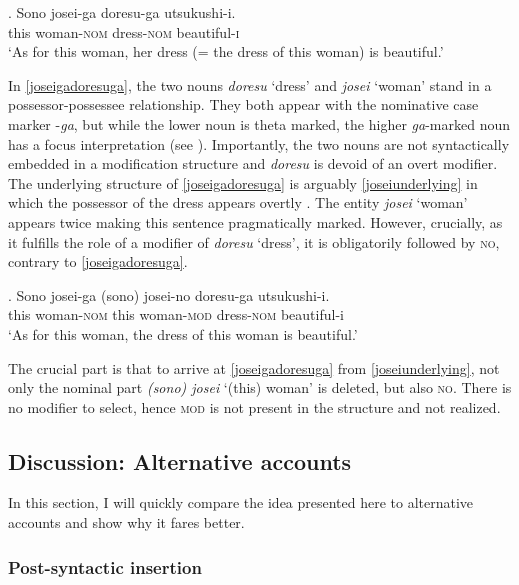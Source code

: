 \exg. Sono josei-ga doresu-ga utsukushi-i.\\
this woman-\textsc{nom} dress-\textsc{nom} beautiful-\textsc{i}\\
`As for this woman, her dress (= the dress of this woman) is beautiful.’ \label{joseigadoresuga}

In \ref{joseigadoresuga}, the two nouns \textit{doresu} `dress’ and \textit{josei} `woman’ stand in a possessor-possessee relationship. They both appear with the nominative case marker -\textit{ga}, but while the lower noun is theta marked, the higher \textit{ga}-marked noun has a focus interpretation (see \citealt{heycock:1993:focus, vermeulen:2005:poss}). Importantly, the two nouns are not syntactically embedded in a modification structure and \textit{doresu} is devoid of an overt modifier. The underlying structure of \ref{joseigadoresuga} is arguably \ref{joseiunderlying} in which the possessor of the dress appears overtly \citep{kuroda:1992:japanese}. The entity \textit{josei} `woman’ appears twice making this sentence pragmatically marked. However, crucially, as it fulfills the role of a modifier of \textit{doresu} `dress’, it is obligatorily followed by \textsc{no}, contrary to \ref{joseigadoresuga}. 

\exg. Sono josei-ga (sono) josei-no doresu-ga utsukushi-i.\\
this woman-\textsc{nom} this woman-\textsc{mod} dress-\textsc{nom} beautiful-i\\
`As for this woman, the dress of this woman is beautiful.’ \label{joseiunderlying}

The crucial part is that to arrive at \ref{joseigadoresuga} from \ref{joseiunderlying}, not only the nominal part \textit{(sono) josei} `(this) woman’ is deleted, but also \textsc{no}. There is no modifier to select, hence \textsc{mod} is not present in the structure and not realized.

\subsection{Discussion: Alternative accounts} \label{comparisonpreviousno}

In this section, I will quickly compare the idea presented here to alternative accounts and show why it fares better.

\subsubsection{Post-syntactic insertion}

